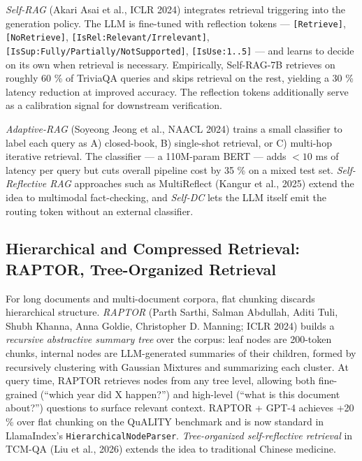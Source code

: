 \documentclass{article}
\begin{document}
\emph{Self-RAG} (Akari Asai et al., ICLR 2024) integrates retrieval triggering into the generation policy. The LLM is fine-tuned with reflection tokens --- \texttt{{[}Retrieve{]}}, \texttt{{[}NoRetrieve{]}}, \texttt{{[}IsRel:Relevant/Irrelevant{]}}, \texttt{{[}IsSup:Fully/Partially/NotSupported{]}}, \texttt{{[}IsUse:1..5{]}} --- and learns to decide on its own when retrieval is necessary. Empirically, Self-RAG-7B retrieves on roughly 60 \% of TriviaQA queries and skips retrieval on the rest, yielding a 30 \% latency reduction at improved accuracy. The reflection tokens additionally serve as a calibration signal for downstream verification.

\emph{Adaptive-RAG} (Soyeong Jeong et al., NAACL 2024) trains a small classifier to label each query as A) closed-book, B) single-shot retrieval, or C) multi-hop iterative retrieval. The classifier --- a 110M-param BERT --- adds \(<10\) ms of latency per query but cuts overall pipeline cost by 35 \% on a mixed test set. \emph{Self-Reflective RAG} approaches such as MultiReflect (Kangur et al., 2025) extend the idea to multimodal fact-checking, and \emph{Self-DC} \citep{wang20242024} lets the LLM itself emit the routing token without an external classifier.

\subsection{Hierarchical and Compressed Retrieval: RAPTOR, Tree-Organized Retrieval}\label{hierarchical-and-compressed-retrieval-raptor-tree-organized-retrieval}

For long documents and multi-document corpora, flat chunking discards hierarchical structure. \emph{RAPTOR} (Parth Sarthi, Salman Abdullah, Aditi Tuli, Shubh Khanna, Anna Goldie, Christopher D. Manning; ICLR 2024) builds a \emph{recursive abstractive summary tree} over the corpus: leaf nodes are 200-token chunks, internal nodes are LLM-generated summaries of their children, formed by recursively clustering with Gaussian Mixtures and summarizing each cluster. At query time, RAPTOR retrieves nodes from any tree level, allowing both fine-grained (``which year did X happen?'') and high-level (``what is this document about?'') questions to surface relevant context. RAPTOR + GPT-4 achieves +20 \% over flat chunking on the QuALITY benchmark and is now standard in LlamaIndex's \texttt{HierarchicalNodeParser}. \emph{Tree-organized self-reflective retrieval} in TCM-QA (Liu et al., 2026) extends the idea to traditional Chinese medicine.
\end{document}
